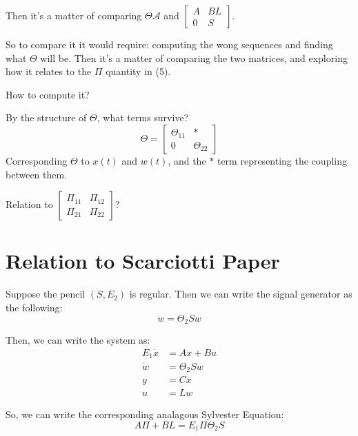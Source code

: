 \documentclass{article}
\begin{document}
Then it's a matter of comparing $\Theta \mathcal{A}$ and 
$\begin{bmatrix}
    A & BL \\
    0 & S
\end{bmatrix}$.

So to compare it it would require: computing the wong sequences and finding what $\Theta$ will be. 
Then it's a matter of comparing the two matrices, and exploring how it relates to the $\Pi$ quantity in (5). 

How to compute it? 

By the structure of $\Theta$, what terms survive?
\begin{equation}
    \Theta 
    =
    \begin{bmatrix}
        \Theta_{11} & * \\
        0 & \Theta_{22}
    \end{bmatrix}
\end{equation}
Corresponding $\Theta$ to $x(t)$ and $w(t)$, and the $*$ term representing the coupling between them. 

Relation to 
$\begin{bmatrix}
    \Pi_{11} & \Pi_{12} \\
    \Pi_{21} & \Pi_{22} 
\end{bmatrix}
$?

\section{Relation to Scarciotti Paper}
Suppose the pencil $(S, E_2)$ is regular. 
Then we can write the signal generator as the following: 
\begin{equation}
    \dot{w} = \Theta_2 S w
\end{equation}

Then, we can write the system as:
\begin{equation}
    \begin{aligned}
        E_1 \dot{x} &= A x + B u \\
        \dot{w} &= \Theta_2 S w \\
        y &= Cx \\
        u &= Lw
    \end{aligned}
\end{equation}

So, we can write the corresponding analagous Sylvester Equation: 
\begin{equation}
    A \Pi + B L = E_1 \Pi \Theta_2 S
\end{equation}
\end{document}
